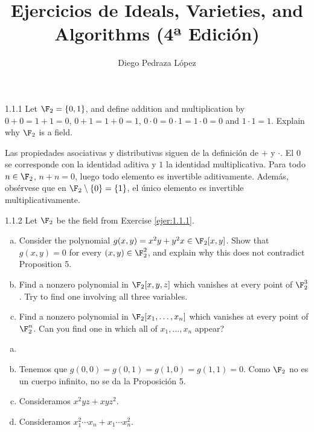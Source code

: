 \documentclass[twoside]{article}
\begin{document}
\title{Ejercicios de Ideals, Varieties, and Algorithms (4ª Edición)}
\author{Diego Pedraza López}
\maketitle

\begin{ejercicio}{1.1.1}\label{ejer:1.1.1}
Let $\F_2 = \{0,1\}$, and define addition and multiplication by $0+0=1+1=0$, $0+1=1+0=1$, $0\cdot 0=0\cdot 1 = 1 \cdot 0 = 0$ and $1 \cdot 1 = 1$.
Explain why $\F_2$ is a field.
\end{ejercicio}
\begin{solucion}
Las propiedades asociativas y distributivas siguen de la definición de $+$ y $\cdot$.
El $0$ se corresponde con la identidad aditiva y $1$ la identidad multiplicativa.
Para todo $n \in \F_2$, $n+n=0$, luego todo elemento es invertible aditivamente.
Además, obsérvese que en $\F_2 \setminus \{0\} = \{1\}$, el único elemento es invertible multiplicativamente.
\end{solucion}

\newpage

\begin{ejercicio}{1.1.2}
Let $\F_2$ be the field from Exercise \ref{ejer:1.1.1}.
\begin{enumerate}[a.]
\item Consider the polynomial $g(x,y)=x^2y+y^2x \in \F_2[x,y]$.
Show that $g(x,y)=0$ for every $(x,y) \in \F_2^2$, and explain why this does not contradict Proposition 5.
\item Find a nonzero polynomial in $\F_2[x,y,z]$ which vanishes at every point of $\F_2^3$.
Try to find one involving all three variables.
\item Find a nonzero polynomial in $\F_2[x_1,\dots,x_n]$ which vanishes at every point of $\F_2^n$.
Can you find one in which all of $x_1,\dots,x_n$ appear?
\end{enumerate}
\end{ejercicio}
\begin{solucion}
\begin{enumerate}[a.]
\item[]
\item Tenemos que $g(0,0)=g(0,1)=g(1,0)=g(1,1)=0$.
Como $\F_2$ no es un cuerpo infinito, no se da la Proposición 5.
\item Consideramos $x^2yz+xyz^2$.
\item Consideramos $x_1^2\cdots x_n + x_1\cdots x_n^2$.
\end{enumerate}
\end{solucion}
\end{document}
